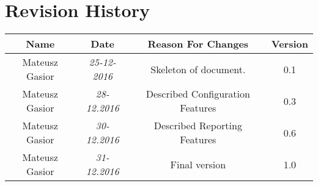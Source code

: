 \chapter*{Revision History}

\begin{center}
    \begin{tabular}{|c|c|c|c|}
        \hline
	    Name & Date & Reason For Changes & Version\\
        \hline
	    Mateusz Gasior & \emph{25-12-2016} & Skeleton of document. & 0.1 \\ \hline
	    Mateusz Gasior & \emph{28-12.2016} & Described Configuration Features & 0.3 \\ \hline
	    Mateusz Gasior & \emph{30-12.2016} & Described Reporting Features & 0.6 \\ \hline
		Mateusz Gasior & \emph{31-12.2016} & Final version & 1.0 \\ \hline
        \hline
    \end{tabular}
\end{center}